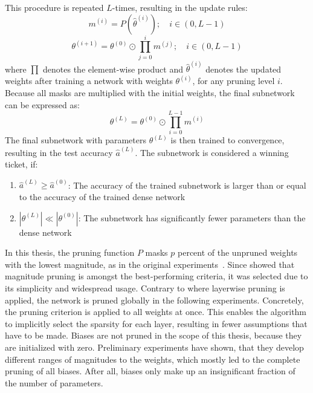 This procedure is repeated $L$-times, resulting in the update rules:
\[ m^{(i)} = \textit{P}(\hat \theta^{(i)}); \quad i \in (0,L-1) \]
\[ \theta^{(i+1)} = \theta^{(0)} \odot \prod_{j=0}^{i}m^{(j)}; \quad i \in (0,L-1) \] 
where $\prod$ denotes the element-wise product and $\hat \theta^{(i)}$ denotes the updated weights after training a network with weights $\theta^{(i)}$, for any pruning level $i$.
Because all masks are multiplied with the initial weights, the final subnetwork can be expressed as:
\[\theta^{(L)} = \theta^{(0)} \odot \prod_{i=0}^{L-1}m^{(i)} \]
The final subnetwork with parameters $\theta^{(L)}$ is then trained to convergence, resulting in the test accuracy $\hat a^{(L)}$.
The subnetwork is considered a winning ticket, if:
\begin{enumerate}
\item  $\hat a^{(L)} \geq \hat a^{(0)}$: The accuracy of the trained subnetwork is larger than or equal to the accuracy of the trained dense network
\item $|\theta^{(L)}| \ll |\theta^{(0)}|$: The subnetwork has significantly fewer parameters than the dense network
\end{enumerate}

In this thesis, the pruning function $P$ masks $p$ percent of the unpruned weights with the lowest magnitude, as in the original experiments~\autocite{LTH}. 
Since \textcite{Supermasks} showed that magnitude pruning is amongst the best-performing criteria, it was selected due to its simplicity and widespread usage.
Contrary to \textcite{LTH} where layerwise pruning is applied, the network is pruned globally in the following experiments.
Concretely, the pruning criterion is applied to all weights at once.
This enables the algorithm to implicitly select the sparsity for each layer, resulting in fewer assumptions that have to be made.
Biases are not pruned in the scope of this thesis, because they are initialized with zero.
Preliminary experiments have shown, that they develop different ranges of magnitudes to the weights, which mostly led to the complete pruning of all biases.
After all, biases only make up an insignificant fraction of the number of parameters. 

